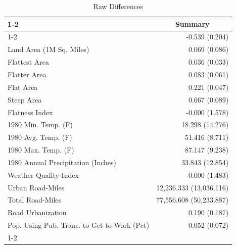 \begin{table}[!h]
\caption{Raw Differences}
\centering
\begin{tabular}{ll}
\cline{1-2}
\multicolumn{1}{r}{} &
  \multicolumn{1}{c}{Summary} \\
\cline{1-2}
\multicolumn{1}{l}{Elasticity (M1, Without Covariates)} &
  \multicolumn{1}{r}{-0.539 (0.204)} \\
\multicolumn{1}{l}{Land Area (1M Sq. Miles)} &
  \multicolumn{1}{r}{0.069 (0.086)} \\
\multicolumn{1}{l}{Flattest Area} &
  \multicolumn{1}{r}{0.036 (0.033)} \\
\multicolumn{1}{l}{Flatter Area} &
  \multicolumn{1}{r}{0.083 (0.061)} \\
\multicolumn{1}{l}{Flat Area} &
  \multicolumn{1}{r}{0.221 (0.047)} \\
\multicolumn{1}{l}{Steep Area} &
  \multicolumn{1}{r}{0.667 (0.089)} \\
\multicolumn{1}{l}{Flatness Index} &
  \multicolumn{1}{r}{-0.000 (1.578)} \\
\multicolumn{1}{l}{1980 Min. Temp. (F)} &
  \multicolumn{1}{r}{18.298 (14.276)} \\
\multicolumn{1}{l}{1980 Avg. Temp. (F)} &
  \multicolumn{1}{r}{51.416 (8.711)} \\
\multicolumn{1}{l}{1980 Max. Temp. (F)} &
  \multicolumn{1}{r}{87.147 (9.238)} \\
\multicolumn{1}{l}{1980 Annual Precipitation (Inches)} &
  \multicolumn{1}{r}{33.843 (12.854)} \\
\multicolumn{1}{l}{Weather Quality Index} &
  \multicolumn{1}{r}{-0.000 (1.483)} \\
\multicolumn{1}{l}{Urban Road-Miles} &
  \multicolumn{1}{r}{12,236.333 (13,036.116)} \\
\multicolumn{1}{l}{Total Road-Miles} &
  \multicolumn{1}{r}{77,556.608 (50,233.887)} \\
\multicolumn{1}{l}{Road Urbanization} &
  \multicolumn{1}{r}{0.190 (0.187)} \\
\multicolumn{1}{l}{Pop. Using Pub. Trans. to Get to Work (Pct)} &
  \multicolumn{1}{r}{0.052 (0.072)} \\
\cline{1-2}
\end{tabular}
\end{table}
